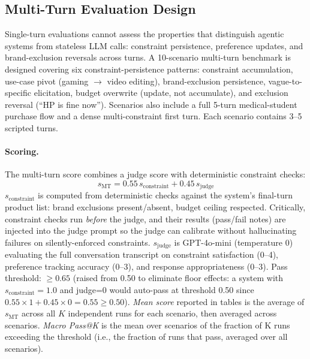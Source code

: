 \documentclass[sigconf,anonymous]{acmart}
\begin{document}
\subsection{Multi-Turn Evaluation Design}
\label{sec:multiturn-eval}

Single-turn evaluations cannot assess the properties that distinguish agentic
systems from stateless LLM calls: constraint persistence, preference updates,
and brand-exclusion reversals across turns.
A 10-scenario multi-turn benchmark is designed covering six
constraint-persistence patterns: constraint accumulation, use-case pivot
(gaming $\to$ video editing), brand-exclusion persistence, vague-to-specific
elicitation, budget overwrite (update, not accumulate), and exclusion reversal
(``HP is fine now''). Scenarios also include a full 5-turn medical-student
purchase flow and a dense multi-constraint first turn. Each scenario contains
3--5 scripted turns.

\paragraph{Scoring.}
The multi-turn score combines a judge score with deterministic constraint checks:
\begin{equation}
  s_{\text{MT}} = 0.55\,s_{\text{constraint}} + 0.45\,s_{\text{judge}}
  \label{eq:multiturn}
\end{equation}
$s_{\text{constraint}}$ is computed from deterministic checks against the
system's final-turn product list: brand exclusions present/absent, budget
ceiling respected. Critically, constraint checks run \emph{before} the judge,
and their results (pass/fail notes) are injected into the judge prompt so
the judge can calibrate without hallucinating failures on silently-enforced
constraints. $s_{\text{judge}}$ is GPT-4o-mini (temperature 0) evaluating
the full conversation transcript on constraint satisfaction (0--4), preference
tracking accuracy (0--3), and response appropriateness (0--3).
Pass threshold: $\geq 0.65$ (raised from 0.50 to eliminate floor effects:
a system with $s_{\text{constraint}}=1.0$ and judge=0 would auto-pass at
threshold 0.50 since $0.55\times 1 + 0.45 \times 0 = 0.55 \geq 0.50$).
\emph{Mean score} reported in tables is the average of $s_{\text{MT}}$
across all $K$ independent runs for each scenario, then averaged across scenarios.
\emph{Macro Pass@K} is the mean over scenarios of the fraction of K runs exceeding
the threshold (i.e., the fraction of runs that pass, averaged over all scenarios).
\end{document}
